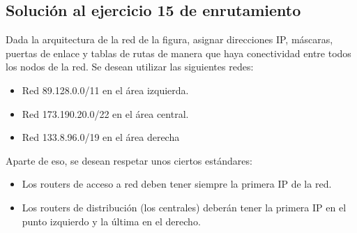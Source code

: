 \documentclass[letterpaper,10pt,spanish]{sphinxmanual}
\begin{document}
\subsection{Solución al ejercicio 15 de enrutamiento}
\label{\detokenize{t2_integracion_elementos/ejercicios_subredes_ipv4/ejercicios_dos_router:solucion-al-ejercicio-15-de-enrutamiento}}
\sphinxAtStartPar
Dada la arquitectura de la red de la figura, asignar direcciones IP, máscaras, puertas de enlace y tablas de rutas de manera que haya conectividad entre todos
los nodos de la red. Se desean utilizar las siguientes redes:
\begin{itemize}
\item {} 
\sphinxAtStartPar
Red 89.128.0.0/11 en el área izquierda.

\item {} 
\sphinxAtStartPar
Red 173.190.20.0/22 en el área central.

\item {} 
\sphinxAtStartPar
Red 133.8.96.0/19 en el área derecha

\end{itemize}

\begin{figure}[htbp]
\centering

\noindent{}
\end{figure}

\sphinxAtStartPar
Aparte de eso, se desean respetar unos ciertos estándares:
\begin{itemize}
\item {} 
\sphinxAtStartPar
Los routers de acceso a red deben tener siempre la primera IP de la red.

\item {} 
\sphinxAtStartPar
Los routers de distribución (los centrales) deberán tener la primera IP en el punto izquierdo y la última en el derecho.

\end{itemize}
\end{document}
